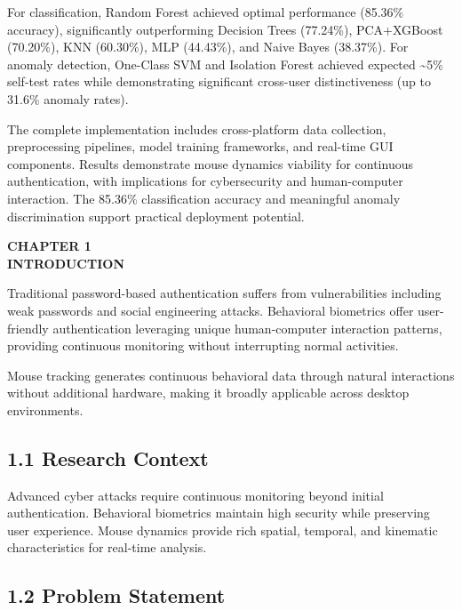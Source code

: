\documentclass[
  11pt,
  a4paper,
]{article}
\begin{document}
For classification, Random Forest achieved optimal performance (85.36\%
accuracy), significantly outperforming Decision Trees (77.24\%),
PCA+XGBoost (70.20\%), KNN (60.30\%), MLP (44.43\%), and Naive Bayes
(38.37\%). For anomaly detection, One-Class SVM and Isolation Forest
achieved expected \textasciitilde5\% self-test rates while demonstrating
significant cross-user distinctiveness (up to 31.6\% anomaly rates).

The complete implementation includes cross-platform data collection,
preprocessing pipelines, model training frameworks, and real-time GUI
components. Results demonstrate mouse dynamics viability for continuous
authentication, with implications for cybersecurity and human-computer
interaction. The 85.36\% classification accuracy and meaningful anomaly
discrimination support practical deployment potential.

\newpage

\newpage
\thispagestyle{plain}

\begin{center}
\vspace*{2cm}
\textbf{\Large CHAPTER 1}\\[0.5cm]
\textbf{\Large INTRODUCTION}
\end{center}

\newpage

Traditional password-based authentication suffers from vulnerabilities
including weak passwords and social engineering attacks. Behavioral
biometrics offer user-friendly authentication leveraging unique
human-computer interaction patterns, providing continuous monitoring
without interrupting normal activities.

Mouse tracking generates continuous behavioral data through natural
interactions without additional hardware, making it broadly applicable
across desktop environments.

\subsection{1.1 Research Context}\label{research-context}

Advanced cyber attacks require continuous monitoring beyond initial
authentication. Behavioral biometrics maintain high security while
preserving user experience. Mouse dynamics provide rich spatial,
temporal, and kinematic characteristics for real-time analysis.

\subsection{1.2 Problem Statement}\label{problem-statement}
\end{document}
